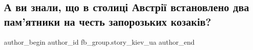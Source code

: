  
 
 
 
 

\subsection{А ви знали, що в столиці Австрії встановлено два пам'ятники на честь запорозьких козаків?}
\label{sec:23_01_2023.fb.fb_group.story_kiev_ua.1.a_vi_znali__shcho_v_}

\ifcmt
 author_begin
   author_id fb_group.story_kiev_ua
 author_end
\fi
